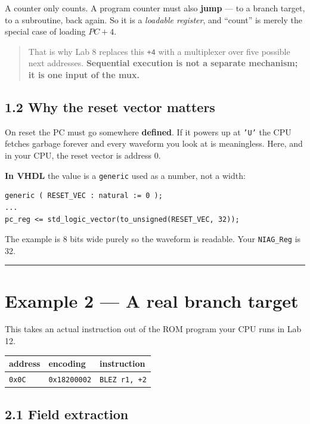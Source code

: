 \documentclass[11pt]{article}
\newcommand{\code}[1]{\texttt{#1}}
\newcommand{\hr}{\vspace{2pt}\hrule\vspace{6pt}}
\begin{document}
A counter only counts. A program counter must also \textbf{jump} --- to a branch
target, to a subroutine, back again. So it is a \emph{loadable register}, and
``count'' is merely the special case of loading $PC+4$.

\begin{quote}
That is why Lab 8 replaces this \code{+4} with a multiplexer over five possible
next addresses. \textbf{Sequential execution is not a separate mechanism; it is
one input of the mux.}
\end{quote}

\subsection*{1.2 Why the reset vector matters}

On reset the PC must go somewhere \textbf{defined}. If it powers up at \code{'U'}
the CPU fetches garbage forever and every waveform you look at is meaningless.
Here, and in your CPU, the reset vector is address 0.

\textbf{In VHDL} the value is a \code{generic} used as a number, not a width:

\begin{lstlisting}
generic ( RESET_VEC : natural := 0 );
...
pc_reg <= std_logic_vector(to_unsigned(RESET_VEC, 32));
\end{lstlisting}

The example is 8 bits wide purely so the waveform is readable. Your
\code{NIAG\_Reg} is 32.

\vspace{4pt}\hr

\section*{Example 2 --- A real branch target}

This takes an actual instruction out of the ROM program your CPU runs in Lab 12.

\begin{center}
\begin{tabular}{lll}
\toprule
address & encoding & instruction \\
\midrule
\code{0x0C} & \code{0x18200002} & \code{BLEZ r1, +2} \\
\bottomrule
\end{tabular}
\end{center}

\subsection*{2.1 Field extraction}
\end{document}
